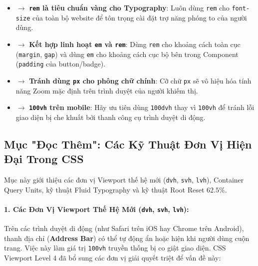 \documentclass[11pt,oneside]{book}
\newcommand{\codeinline}[1]{\textcolor{accentOrange}{\texttt{#1}}}
\newcommand{\term}[1]{\textbf{\textcolor{primaryBlue}{#1}}}
\begin{document}
\begin{tipBox}
\begin{itemize}[leftmargin=1.5em, itemsep=4pt, parsep=0pt]
    \item $\rightarrow$ \textbf{\codeinline{rem} là tiêu chuẩn vàng cho Typography}: Luôn dùng \codeinline{rem} cho \codeinline{font-size} của toàn bộ website để tôn trọng cài đặt trợ năng phóng to của người dùng.
    \item $\rightarrow$ \textbf{Kết hợp linh hoạt \codeinline{em} và \codeinline{rem}}: Dùng \codeinline{rem} cho khoảng cách toàn cục (\codeinline{margin}, \codeinline{gap}) và dùng \codeinline{em} cho khoảng cách cục bộ bên trong Component (\codeinline{padding} của button/badge).
    \item $\rightarrow$ \textbf{Tránh dùng \codeinline{px} cho phông chữ chính}: Cỡ chữ \codeinline{px} sẽ vô hiệu hóa tính năng Zoom mặc định trên trình duyệt của người khiếm thị.
    \item $\rightarrow$ \textbf{\codeinline{100vh} trên mobile}: Hãy ưu tiên dùng \codeinline{100dvh} thay vì \codeinline{100vh} để tránh lỗi giao diện bị che khuất bởi thanh công cụ trình duyệt di động.
\end{itemize}
\end{tipBox}

\subsection{Mục "Đọc Thêm": Các Kỹ Thuật Đơn Vị Hiện Đại Trong CSS}
\label{sec:css_modern_units_deepdive}

\begin{conceptBox}
Mục này giới thiệu các đơn vị Viewport thế hệ mới (\codeinline{dvh}, \codeinline{svh}, \codeinline{lvh}), Container Query Units, kỹ thuật Fluid Typography và kỹ thuật Root Reset $62.5\%$.
\end{conceptBox}

\paragraph{1. Các Đơn Vị Viewport Thế Hệ Mới (\codeinline{dvh}, \codeinline{svh}, \codeinline{lvh}):}
Trên các trình duyệt di động (như Safari trên iOS hay Chrome trên Android), thanh địa chỉ (\term{Address Bar}) có thể tự động ẩn hoặc hiện khi người dùng cuộn trang. Việc này làm giá trị \codeinline{100vh} truyền thống bị co giật giao diện. CSS Viewport Level 4 đã bổ sung các đơn vị giải quyết triệt để vấn đề này:
\end{document}
